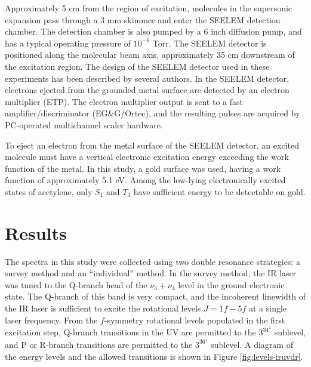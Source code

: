 \documentclass[12pt]{mitthesis}
\begin{document}
Approximately 5 cm from the region of excitation, molecules in the
supersonic expansion pass through a 3 mm skimmer and enter the SEELEM
detection chamber.  The detection chamber is also pumped by a 6 inch
diffusion pump, and has a typical operating pressure of $10^{-6}$
Torr.  The SEELEM detector is positioned along the molecular beam
axis, approximately 35 cm downstream of the excitation region.  The
design of the SEELEM detector used in these experiments has been
described by several authors.  In the SEELEM detector, electrons
ejected from the grounded metal surface are detected by an electron
multiplier (ETP).  The electron multiplier output is sent to a fast
amplifier/discriminator (EG\&G/Ortec), and the resulting pulses are
acquired by PC-operated multichannel scaler hardware.

To eject an electron from the metal surface of the SEELEM detector, an
excited molecule must have a vertical electronic excitation energy
exceeding the work function of the metal.  In this study, a gold
surface was used, having a work function of approximately 5.1 eV.
Among the low-lying electronically excited states of acetylene, only
$S_1$ and $T_3$ have sufficient energy to be detectable on gold.





















\section{Results}

The spectra in this study were collected using two double resonance
strategies: a survey method and an ``individual'' method.  In the
survey method, the IR laser was tuned to the Q-branch head of the
$\nu_3+\nu_4$ level in the ground electronic state.  The Q-branch of
this band is very compact, and the incoherent linewidth of the IR
laser is sufficient to excite the rotational levels $J=1f-5f$ at a
single laser frequency.  From the $f$-symmetry rotational levels
populated in the first excitation step, Q-branch transitions in the UV
are permitted to the $3^34^1$  sublevel, and P or R-branch
transitions are permitted to the $3^36^1$  sublevel.  A diagram
of the energy levels and the allowed transitions is shown in Figure
\ref{fig:levels-iruvdr}.
\end{document}
